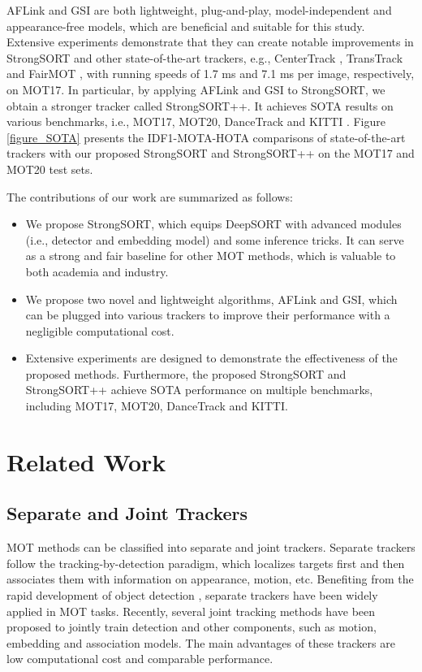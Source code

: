 \documentclass[lettersize,journal]{IEEEtran}
\begin{document}
AFLink and GSI are both lightweight, plug-and-play, model-independent and appearance-free models,
which are beneficial and suitable for this study.
Extensive experiments demonstrate that they can create notable improvements in StrongSORT and other state-of-the-art trackers, 
e.g., CenterTrack \cite{zhou2020tracking}, TransTrack \cite{sun2020transtrack} and FairMOT \cite{zhang2021fairmot},
with running speeds of 1.7 ms and 7.1 ms per image, respectively, on MOT17.
In particular, by applying AFLink and GSI to StrongSORT, we obtain a stronger tracker called StrongSORT++.
It achieves SOTA results on various benchmarks, i.e., MOT17, MOT20, DanceTrack \cite{sun2022dancetrack} and KITTI \cite{geiger2013vision}.
Figure \ref{figure_SOTA} presents the IDF1-MOTA-HOTA comparisons of state-of-the-art trackers 
with our proposed StrongSORT and StrongSORT++ on the MOT17 and MOT20 test sets.

The contributions of our work are summarized as follows:

\begin{itemize}
  \item We propose StrongSORT, which equips DeepSORT with advanced modules (i.e., detector and embedding model) and some inference tricks.
It can serve as a strong and fair baseline for other MOT methods, which is valuable to both academia and industry.
  \item We propose two novel and lightweight algorithms, AFLink and GSI, which can be plugged into various trackers 
to improve their performance with a negligible computational cost.
  \item Extensive experiments are designed to demonstrate the effectiveness of the proposed methods. 
  Furthermore, the proposed StrongSORT and StrongSORT++ achieve SOTA performance on multiple benchmarks, including MOT17, MOT20, DanceTrack and KITTI.
\end{itemize}

\section{Related Work}

\subsection{Separate and Joint Trackers}

MOT methods can be classified into separate and joint trackers.
Separate trackers \cite{yu2016poi, bewley2016simple, wojke2017simple, bochinski2017high, naiel2017online, he2021learnable}
follow the tracking-by-detection paradigm, which localizes targets first and then associates them with information on appearance, motion, etc.
Benefiting from the rapid development of object detection 
\cite{ren2015faster, redmon2018yolov3, ge2021yolox}, 
separate trackers have been widely applied in MOT tasks.
Recently, several joint tracking methods 
\cite{xu2020train, 9709649, liang2022rethinking, wang2021multiple}
have been proposed to jointly train detection and other components, such as motion, embedding and association models.
The main advantages of these trackers are low computational cost and comparable performance.
\end{document}

